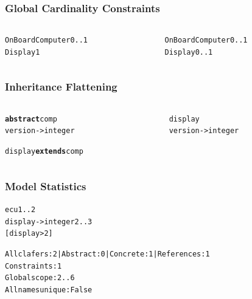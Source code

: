 \documentclass[table,15pt,t]{beamer}
\newcounter{i}
\begin{document}
\begin{frame}[fragile]
  \frametitle{Global Cardinality Constraints}
  \begin{columns}
    \begin{column}{0.5\textwidth}
      \begin{alltt}
        \begin{small}
\textsf{OnBoardComputer} 0..1
  \textsf{Display} 1
        \end{small}
      \end{alltt}
    \end{column}
\pause
    \begin{column}{0.5\textwidth}
      \begin{alltt}
        \begin{small}
\textsf{OnBoardComputer} 0..1
  \textsf{Display} 0..1
        \end{small}
      \end{alltt}
    \end{column}
  \end{columns}

\end{frame}

\begin{frame}[fragile]
  \frametitle{Inheritance Flattening}
  \begin{columns}
    \begin{column}{0.5\textwidth}
      \begin{alltt}
        \begin{small}
\textbf{abstract} \textsf{comp}
  \textsf{version} -> \textsf{integer}

\textsf{display} \textbf{extends} \textsf{comp}
        \end{small}
      \end{alltt}
    \end{column}
\pause
    \begin{column}{0.5\textwidth}
      \begin{alltt}
        \begin{small}
\textsf{display}
  \textsf{version} -> \textsf{integer}
        \end{small}
      \end{alltt}
    \end{column}
  \end{columns}
\end{frame}

\begin{frame}[fragile]
  \frametitle{Model Statistics}
      \begin{alltt}
        \begin{small}
\textsf{ecu} 1..2
  \textsf{display} -> \textsf{integer} 2..3
  \textsf{[display > 2]}
        \end{small}
      \end{alltt}
\pause
      \begin{alltt}
        \begin{small}
All clafers: 2 | Abstract: 0 | Concrete: 1 | References: 1
Constraints: 1
Global scope: 2..6
All names unique: False
        \end{small}
      \end{alltt}
\end{frame}
\end{document}
